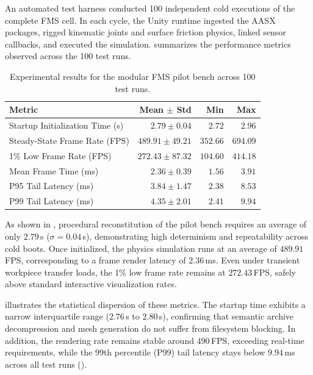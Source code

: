 An automated test harness conducted 100 independent cold executions of the complete \gls{FMS} cell. In each cycle, the Unity runtime ingested the \gls{AASX} packages, rigged kinematic joints and surface friction physics, linked sensor callbacks, and executed the simulation.  summarizes the performance metrics observed across the 100 test runs.

\begin{table}[htbp]
    \centering
    \caption{Experimental results for the modular \gls{FMS} pilot bench across 100 test runs.}
    \label{tab:fms_results}
    \renewcommand{\arraystretch}{1.3}
    \small
    \begin{tabular}{lrrr}
        \toprule
        \textbf{Metric} & \textbf{Mean $\pm$ Std} & \textbf{Min} & \textbf{Max} \\
        \midrule
        Startup Initialization Time (s)     & $2.79 \pm 0.04$   & $2.72$   & $2.96$   \\
        Steady-State Frame Rate (\gls{FPS}) & $489.91 \pm 49.21$ & $352.66$ & $694.09$ \\
        1\% Low Frame Rate (\gls{FPS})      & $272.43 \pm 87.32$ & $104.60$ & $414.18$ \\
        Mean Frame Time (ms)                & $2.36 \pm 0.39$   & $1.56$   & $3.91$   \\
        P95 Tail Latency (ms)               & $3.84 \pm 1.47$   & $2.38$   & $8.53$   \\
        P99 Tail Latency (ms)               & $4.35 \pm 2.01$   & $2.41$   & $9.94$   \\
        \bottomrule
    \end{tabular}
\end{table}

As shown in , procedural reconstitution of the pilot bench requires an average of only $2.79\,$s ($\sigma = 0.04\,$s), demonstrating high determinism and repeatability across cold boots. Once initialized, the physics simulation runs at an average of $489.91\,$\gls{FPS}, corresponding to a frame render latency of $2.36\,$ms. Even under transient workpiece transfer loads, the 1\% low frame rate remains at $272.43\,$\gls{FPS}, safely above standard interactive visualization rates.

 illustrates the statistical dispersion of these metrics. The startup time exhibits a narrow interquartile range ($2.76\,$s to $2.80\,$s), confirming that semantic archive decompression and mesh generation do not suffer from filesystem blocking. In addition, the rendering rate remains stable around $490\,$\gls{FPS}, exceeding real-time requirements, while the 99th percentile (P99) tail latency stays below $9.94\,$ms across all test runs ().

